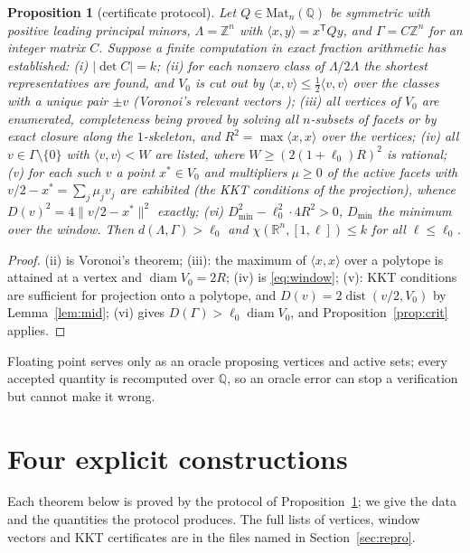 \documentclass[10pt]{article}
\theoremstyle{plain}
\newtheorem{proposition}[theorem]{Proposition}
\theoremstyle{remark}
\newcommand{\R}{\mathbb{R}}
\newcommand{\Z}{\mathbb{Z}}
\newcommand{\Q}{\mathbb{Q}}
\newcommand{\diam}{\operatorname{diam}}
\newcommand{\dist}{\operatorname{dist}}
\begin{document}
\begin{proposition}[certificate protocol]\label{prop:protocol}
Let $Q\in\mathrm{Mat}_n(\Q)$ be symmetric with positive leading principal
minors, $\Lambda=\Z^n$ with $\langle x,y\rangle=x^{\mathsf T}Qy$, and
$\Gamma=C\Z^n$ for an integer matrix $C$. Suppose a finite computation in
exact fraction arithmetic has established:
\textup{(i)} $|\det C|=k$;
\textup{(ii)} for each nonzero class of $\Lambda/2\Lambda$ the shortest
representatives are found, and $V_0$ is cut out by
$\langle x,v\rangle\le\frac12\langle v,v\rangle$ over the classes with a
unique pair $\pm v$ (Voronoi's relevant vectors
\cite[Ch.~21]{ConwaySloane});
\textup{(iii)} all vertices of $V_0$ are enumerated, completeness being
proved by solving all $n$-subsets of facets or by exact closure along the
$1$-skeleton, and $R^2=\max\langle x,x\rangle$ over the vertices;
\textup{(iv)} all $v\in\Gamma\setminus\{0\}$ with $\langle v,v\rangle<W$ are
listed, where $W\ge(2(1+\ell_0)R)^2$ is rational;
\textup{(v)} for each such $v$ a point $x^*\in V_0$ and multipliers $\mu\ge0$
of the active facets with $v/2-x^*=\sum_j\mu_jv_j$ are exhibited (the KKT
conditions of the projection), whence $D(v)^2=4\|v/2-x^*\|^2$ exactly;
\textup{(vi)} $D_{\min}^2-\ell_0^2\cdot4R^2>0$, $D_{\min}$ the minimum over
the window.
Then $d(\Lambda,\Gamma)>\ell_0$ and $\chi(\R^n,[1,\ell])\le k$ for all
$\ell\le\ell_0$.
\end{proposition}

\begin{proof}
(ii) is Voronoi's theorem; (iii): the maximum of $\langle x,x\rangle$ over a
polytope is attained at a vertex and $\diam V_0=2R$; (iv) is
\eqref{eq:window}; (v): KKT conditions are sufficient for projection onto a
polytope, and $D(v)=2\dist(v/2,V_0)$ by Lemma~\ref{lem:mid}; (vi) gives
$D(\Gamma)>\ell_0\diam V_0$, and Proposition~\ref{prop:crit} applies.
\end{proof}

Floating point serves only as an oracle proposing vertices and active sets;
every accepted quantity is recomputed over $\Q$, so an oracle error can stop
a verification but cannot make it wrong.

\section{Four explicit constructions}\label{sec:constr}

Each theorem below is proved by the protocol of
Proposition~\ref{prop:protocol}; we give the data and the quantities the
protocol produces. The full lists of vertices, window vectors and KKT
certificates are in the files named in Section~\ref{sec:repro}.
\end{document}
